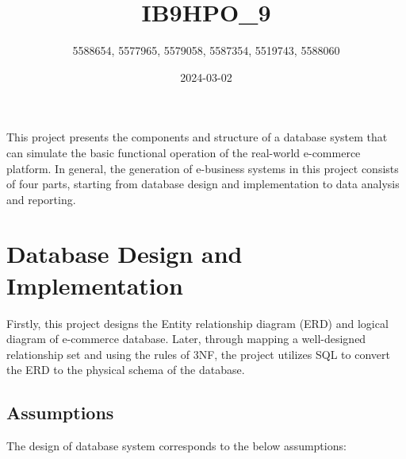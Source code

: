 \documentclass[
  letterpaper,
  DIV=11,
  numbers=noendperiod]{scrartcl}
\title{IB9HPO\_9}
\author{5588654, 5577965, 5579058, 5587354, 5519743, 5588060}
\date{2024-03-02}
\begin{document}
\maketitle
\ifdefined\Shaded\renewenvironment{Shaded}{\begin{tcolorbox}[boxrule=0pt, breakable, frame hidden, sharp corners, enhanced, interior hidden, borderline west={3pt}{0pt}{shadecolor}]}{\end{tcolorbox}}\fi

This project presents the components and structure of a database system
that can simulate the basic functional operation of the real-world
e-commerce platform. In general, the generation of e-business systems in
this project consists of four parts, starting from database design and
implementation to data analysis and reporting.

\hypertarget{database-design-and-implementation}{%
\section{Database Design and
Implementation}\label{database-design-and-implementation}}

Firstly, this project designs the Entity relationship diagram (ERD) and
logical diagram of e-commerce database. Later, through mapping a
well-designed relationship set and using the rules of 3NF, the project
utilizes SQL to convert the ERD to the physical schema of the database.

\hypertarget{assumptions}{%
\subsection{Assumptions}\label{assumptions}}

The design of database system corresponds to the below assumptions:
\end{document}
